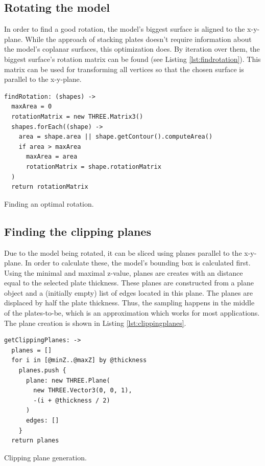 \documentclass[../ClassicThesis.tex]{subfiles}
\begin{document}
\subsection{Rotating the model}

In order to find a good rotation, the model's biggest surface is aligned to the x-y-plane. While the approach of stacking plates doesn't require information about the model's coplanar surfaces, this optimization does. By iteration over them, the biggest surface's rotation matrix can be found (see Listing \ref{lst:findrotation}). This matrix can be used for transforming all vertices so that the chosen surface is parallel to the x-y-plane.

\begin{listing}
\begin{verbatim}
findRotation: (shapes) ->
  maxArea = 0
  rotationMatrix = new THREE.Matrix3()
  shapes.forEach((shape) ->
    area = shape.area || shape.getContour().computeArea()
    if area > maxArea
      maxArea = area
      rotationMatrix = shape.rotationMatrix
  )
  return rotationMatrix
\end{verbatim}
\caption{Finding an optimal rotation.}
\label{lst:findrotation}
\end{listing}

\subsection{Finding the clipping planes}

Due to the model being rotated, it can be sliced using planes parallel to the x-y-plane. In order to calculate these, the model's bounding box is calculated first. Using the minimal and maximal z-value, planes are creates with an distance equal to the selected plate thickness. These planes are constructed from a \threejs plane object and a (initially empty) list of edges located in this plane. The planes are displaced by half the plate thickness. Thus, the sampling happens in the middle of the plates-to-be, which is an approximation which works for most applications. The plane creation is shown in Listing \ref{lst:clippingplanes}.

\begin{listing}
\begin{verbatim}
getClippingPlanes: ->
  planes = []
  for i in [@minZ..@maxZ] by @thickness
    planes.push {
      plane: new THREE.Plane(
        new THREE.Vector3(0, 0, 1), 
        -(i + @thickness / 2)
      )
      edges: []
    }
  return planes
\end{verbatim}
\caption{Clipping plane generation.}
\label{lst:clippingplanes}
\end{listing}
\end{document}
